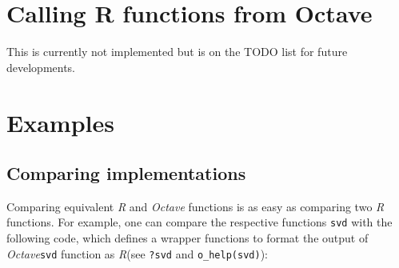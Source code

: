 \documentclass[english,10pt,a4paper]{article}\usepackage{graphicx, color}
\let\proglang=\textit
\let\code=\texttt
\newcommand{\R}{\proglang{R}\xspace}
\newcommand{\octave}{\proglang{Octave}\xspace}
\begin{document}
\section{Calling R functions from Octave}

This is currently not implemented but is on the TODO list for future
developments.

\section{Examples}
\subsection{Comparing implementations}

Comparing equivalent \R and \octave functions is as easy as comparing two \R
functions.
For example, one can compare the respective functions \code{svd} with the
following code, which defines a wrapper functions to format the output of
\octave \code{svd} function as \R (see \code{?svd} and \code{o\_help(svd)}):
\end{document}
